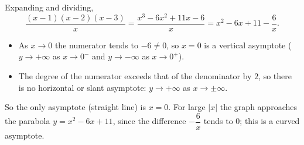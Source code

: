 Expanding and dividing,
\[
\dfrac{(x-1)(x-2)(x-3)}{x}=\dfrac{x^3-6x^2+11x-6}{x}=x^2-6x+11-\dfrac{6}{x} .
\]
\begin{itemize}
\item As $x\to0$ the numerator tends to $-6\ne0$, so $\boxed{x=0}$ is a vertical asymptote ($y\to+\infty$ as $x\to0^-$ and $y\to-\infty$ as $x\to0^+$).
\item The degree of the numerator exceeds that of the denominator by $2$, so there is no horizontal or slant asymptote: $y\to+\infty$ as $x\to\pm\infty$.
\end{itemize}
So the only asymptote (straight line) is $x=0$. For large $|x|$ the graph approaches the parabola $y=x^2-6x+11$, since the difference $-\dfrac{6}{x}$ tends to $0$; this is a curved asymptote.
